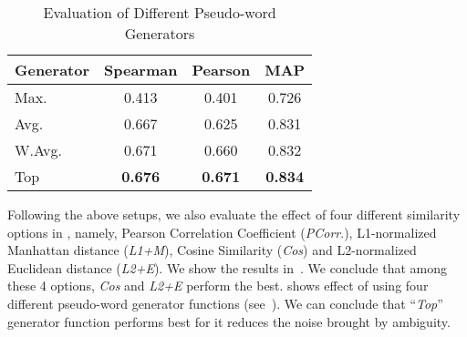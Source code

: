 \begin{table}[th]
	\centering
	\small
	\caption{\small Evaluation of Different Pseudo-word Generators}
	\begin{tabular}{|l|c|c|c|}
		\hline
		\textbf{Generator} & \textbf{Spearman} & \textbf{Pearson}   & \textbf{MAP} \\ \hline \hline
		Max. & 0.413 & 0.401 & 0.726\\ \hline
		Avg. & 0.667 & 0.625 & 0.831\\ \hline
		W.Avg. & 0.671 & 0.660 & 0.832 \\  \hline
		Top & \textbf{0.676} & \textbf{0.671} & \textbf{0.834} \\ \hline
	\end{tabular}
	\label{tab:mcdne_res_3}
\end{table}
Following the above setups, we also evaluate the effect of four different similarity options in \textit{\socvec},
namely, Pearson Correlation Coefficient (\textit{PCorr}.), L1-normalized Manhattan distance (\textit{L1+M}), 
Cosine Similarity (\textit{Cos}) and  L2-normalized Euclidean distance (\textit{L2+E}).
We show the results in~. We conclude that among these 4 options, \textit{Cos} and \textit{L2+E} perform the best. 
 shows effect of using four different 
pseudo-word generator functions (see~). We can conclude 
that ``\textit{Top}'' generator function performs best for 
it reduces the noise brought by ambiguity. 






